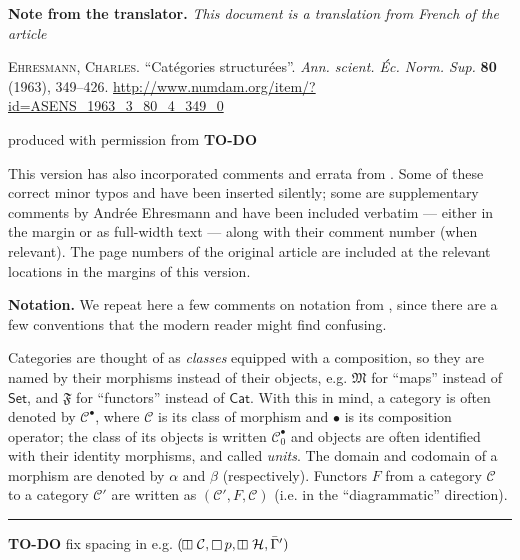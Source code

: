 \documentclass[a4paper,oneside,nobib,nofonts,notitlepage,notoc,nols,fleqn,justified]{tufte-book}
\title{\sc{Structured categories}}
\author{Charles Ehresmann}
\date{1963}
\newcommand{\origcit}{%
  \textsc{Ehresmann, Charles.}
  ``Catégories structurées''.
  \emph{Ann. scient. Éc. Norm. Sup.} \textbf{80} (1963), 349--426.
  \url{http://www.numdam.org/item/?id=ASENS_1963_3_80_4_349_0}
}
\newenvironment{translator}[1]
  {\phantomsection\par\medskip\noindent\small\textbf{#1.}\itshape}
  {\par\medskip}
\newenvironment{rmenv}[1]
  {\phantomsection\par\medskip\noindent\textbf{#1.}\rmfamily}
  {\par\medskip}
\newcommand{\todo}{{\color{purple}\textbf{TO-DO }}}
\newcommand{\CC}{\mathcal{C}}
\newcommand{\HH}{\mathcal{H}}
\newcommand{\MM}{\mathfrak{M}}
\newcommand{\FF}{\mathfrak{F}}
\DeclareMathOperator{\sq}{\square}
\DeclareMathOperator{\vsq}{\raisebox{-.1em}{\rotatebox{90}{$\boxminus$}\,}}
\begin{document}
\maketitle

\begin{fullwidth}
  \begin{translator}{Note from the translator}
    This document is a translation from French of the article

    \medskip
    {\normalfont\origcit}

    \medskip
    produced with permission from \todo

    This version has also incorporated comments and errata from \cite[Comments on Part III-1, p.~342--363]{coll}.
    Some of these correct minor typos and have been inserted silently; some are supplementary comments by Andrée Ehresmann and have been included verbatim --- either in the margin or as full-width text --- along with their comment number (when relevant).
    The page numbers of the original article are included at the relevant locations in the margins of this version.
  \end{translator}

  \begin{rmenv}{Notation}
    We repeat here a few comments on notation from \cite[Comments on Part III-1, p.~337--338]{coll}, since there are a few conventions that the modern reader might find confusing.

    Categories are thought of as \emph{classes} equipped with a composition, so they are named by their morphisms instead of their objects, e.g. $\MM$ for ``maps'' instead of $\mathsf{Set}$, and $\FF$ for ``functors'' instead of $\mathsf{Cat}$.
    With this in mind, a category is often denoted by $\CC^\bullet$, where $\CC$ is its class of morphism and $\bullet$ is its composition operator; the class of its objects is written $\CC_0^\bullet$ and objects are often identified with their identity morphisms, and called \emph{units}.
    The domain and codomain of a morphism are denoted by $\alpha$ and $\beta$ (respectively).
    Functors $F$ from a category $\CC$ to a category $\CC'$ are written as $(\CC',F,\CC)$ (i.e. in the ``diagrammatic'' direction).
  \end{rmenv}

  \bigskip
  \hrule
  \bigskip
\end{fullwidth}


\todo fix spacing in e.g. $(\vsq\CC,\sq p,\vsq\HH,\bar{\Gamma}')$
\end{document}
